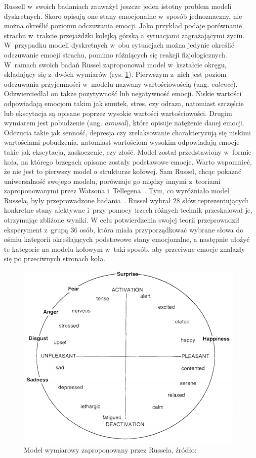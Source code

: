 Russell w~swoich badaniach zauważył jeszcze jeden istotny problem modeli dyskretnych. Skoro opisują one stany emocjonalne w~sposób jednoznaczny, nie można określić poziomu odczuwania emocji. Jako przykład podaje porównanie strachu w~trakcie przejażdżki kolejką górską a sytuacjami zagrażającymi życiu. W~przypadku modeli dyskretnych w~obu sytuacjach można jedynie określić odczuwanie emocji strachu, pomimo różniących się reakcji fizjologicznych. W~ramach swoich badań Russel zaproponował model w~kształcie okręgu, składający się z~dwóch wymiarów (rys. \ref{fig:circumplex}). Pierwszym z~nich jest poziom odczuwania przyjemności w~modelu nazwany wartościowością (ang. \textit{valence}). Odzwierciedlał on także pozytywność lub negatywność emocji. Niskie wartości odpowiadają emocjom takim jak smutek, stres, czy odraza, natomiast szczęście lub ekscytacja są opisane poprzez wysokie wartości wartościowości. Drugim wymiarem jest pobudzenie (ang. \textit{arousal}), które opisuje natężenie danej emocji. Odczucia takie jak senność, depresja czy zrelaksowanie charakteryzują się niskimi wartościami pobudzenia, natomiast wartościom wysokim odpowiadają emocje takie jak ekscytacja, zaskoczenie, czy złość. Model został przedstawiony w~formie koła, na którego brzegach opisane zostały podstawowe emocje. Warto wspomnieć, że nie jest to pierwszy model o strukturze kołowej. Sam Russel, chcąc pokazać uniwersalność swojego modelu, porównuje go między innymi z~teoriami zaproponowanymi przez Watsona i~Tellegena~\cite{Watson_1985}. Tym, co wyróżniało model Russela, były przeprowadzone badania~\cite{circumplex_model_russel_1980}. Russel wybrał 28 słów reprezentujących konkretne stany afektywne i~przy pomocy trzech różnych technik przeskalował je, otrzymując zbliżone wyniki. W celu potwierdzenia swojej teorii przeprowadził eksperyment z~grupą 36 osób, która miała przyporządkować wybrane słowa do ośmiu kategorii określających podstawowe stany emocjonalne, a następnie ułożyć te kategorie na modelu kołowym w~taki sposób, aby przeciwne emocje znalazły się po przeciwnych stronach koła.

\begin{figure}[h]
	\centering
	\includegraphics[width=0.6\linewidth]{images/circumplex.png}
	\caption{Model wymiarowy zaproponowany przez Russela, źródło: \cite{russel_barret_core_affect}}
	\label{fig:circumplex}
\end{figure}

